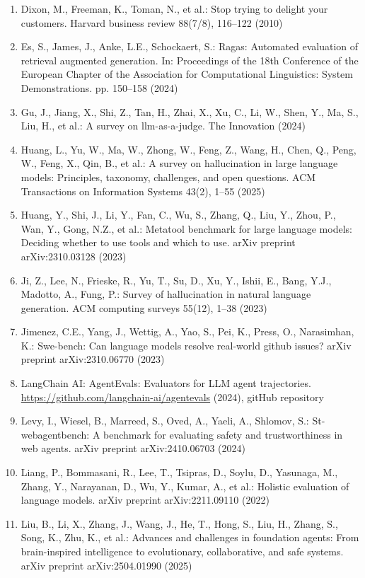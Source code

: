 \documentclass[11pt,UTF8,fontset=fandol]{ctexart}
\begin{document}
\begin{enumerate}[leftmargin=2em,labelsep=0.6em]
\item Dixon, M., Freeman, K., Toman, N., et al.: Stop trying to delight your customers. Harvard business review 88(7/8), 116--122 (2010)
\item Es, S., James, J., Anke, L.E., Schockaert, S.: Ragas: Automated evaluation of retrieval augmented generation. In: Proceedings of the 18th Conference of the European Chapter of the Association for Computational Linguistics: System Demonstrations. pp. 150--158 (2024)
\item Gu, J., Jiang, X., Shi, Z., Tan, H., Zhai, X., Xu, C., Li, W., Shen, Y., Ma, S., Liu, H., et al.: A survey on llm-as-a-judge. The Innovation (2024)
\item Huang, L., Yu, W., Ma, W., Zhong, W., Feng, Z., Wang, H., Chen, Q., Peng, W., Feng, X., Qin, B., et al.: A survey on hallucination in large language models: Principles, taxonomy, challenges, and open questions. ACM Transactions on Information Systems 43(2), 1--55 (2025)
\item Huang, Y., Shi, J., Li, Y., Fan, C., Wu, S., Zhang, Q., Liu, Y., Zhou, P., Wan, Y., Gong, N.Z., et al.: Metatool benchmark for large language models: Deciding whether to use tools and which to use. arXiv preprint arXiv:2310.03128 (2023)
\item Ji, Z., Lee, N., Frieske, R., Yu, T., Su, D., Xu, Y., Ishii, E., Bang, Y.J., Madotto, A., Fung, P.: Survey of hallucination in natural language generation. ACM computing surveys 55(12), 1--38 (2023)
\item Jimenez, C.E., Yang, J., Wettig, A., Yao, S., Pei, K., Press, O., Narasimhan, K.: Swe-bench: Can language models resolve real-world github issues? arXiv preprint arXiv:2310.06770 (2023)
\item LangChain AI: AgentEvals: Evaluators for LLM agent trajectories. \url{https://github.com/langchain-ai/agentevals} (2024), gitHub repository
\item Levy, I., Wiesel, B., Marreed, S., Oved, A., Yaeli, A., Shlomov, S.: St-webagentbench: A benchmark for evaluating safety and trustworthiness in web agents. arXiv preprint arXiv:2410.06703 (2024)
\item Liang, P., Bommasani, R., Lee, T., Tsipras, D., Soylu, D., Yasunaga, M., Zhang, Y., Narayanan, D., Wu, Y., Kumar, A., et al.: Holistic evaluation of language models. arXiv preprint arXiv:2211.09110 (2022)
\item Liu, B., Li, X., Zhang, J., Wang, J., He, T., Hong, S., Liu, H., Zhang, S., Song, K., Zhu, K., et al.: Advances and challenges in foundation agents: From brain-inspired intelligence to evolutionary, collaborative, and safe systems. arXiv preprint arXiv:2504.01990 (2025)

\end{enumerate}
\end{document}
